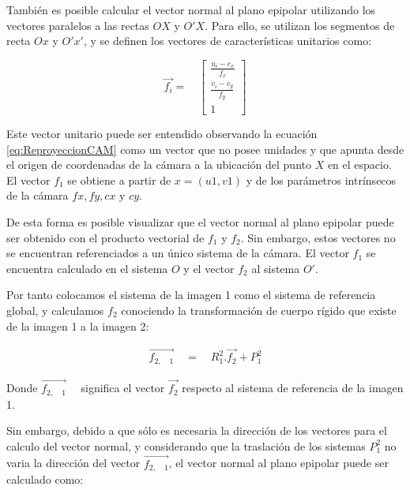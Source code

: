 También es posible calcular el vector normal al plano epipolar utilizando los vectores paralelos a las rectas $OX$ y $O'X$. Para ello, se utilizan los segmentos de recta $Ox$ y $O'x'$, y se definen los vectores de características unitarios como:

\begin{equation}
\overset { \rightarrow  }{ { f }_{ i } } =\quad \left[ \begin{matrix} \frac { u_{ i }-{ c }_{ x } }{ { f }_{ x } }  \\ \frac { { v }_{ i }-{ c }_{ y } }{ { f }_{ y } }  \\ 1 \end{matrix} \right] 
\end{equation}

Este vector unitario puede ser entendido observando la ecuación \ref{eq:ReproyeccionCAM} como un vector que no posee unidades y que apunta desde el origen de coordenadas de la cámara a la ubicación del punto $X$ en el espacio. El vector ${ f }_{ 1}$ se obtiene a partir  de $x = (u1,v1)$  y de los parámetros intrínsecos de la cámara $fx, fy, cx$ y $cy$.

De esta forma es posible visualizar que el vector normal al plano epipolar puede ser obtenido con el producto vectorial de ${ f }_{ 1}$ y ${ f }_{ 2}$. Sin embargo, estos vectores no se encuentran referenciados a un único sistema de la cámara. El vector ${ f }_{ 1}$ se encuentra calculado en el sistema $O$ y el vector ${ f }_{ 2}$ al sistema $O'$. 

Por tanto colocamos el sistema de la imagen 1 como el sistema de referencia global, y calculamos  ${ f }_{ 2}$ 
conociendo la transformación de cuerpo rígido que existe de la imagen 1 a la imagen 2:

\begin{equation}
\begin{matrix} \overset { \rightarrow  }{ { f }_{ 2,\quad 1 } } \quad =\quad { R }_{ 1 }^{ 2 }.\overset { \rightarrow  }{ { f }_{ 2 } } +{ P }_{ 1 }^{ 2 } \end{matrix}
\end{equation}

Donde $\overset { \rightarrow  }{ { f }_{ 2,\quad 1 } } \quad $ significa el vector $\overset { \rightarrow  }{ { f }_{ 2 } } $ respecto al sistema de referencia de la imagen 1.

Sin embargo, debido a que sólo es necesaria la dirección de los vectores para el calculo del vector normal, y considerando que la traslación de los sistemas ${ P }_{ 1 }^{ 2 }$ no varia la dirección del vector $\overset { \rightarrow  }{ { f }_{ 2,\quad 1 } }$, el vector normal al plano epipolar puede ser calculado como:


